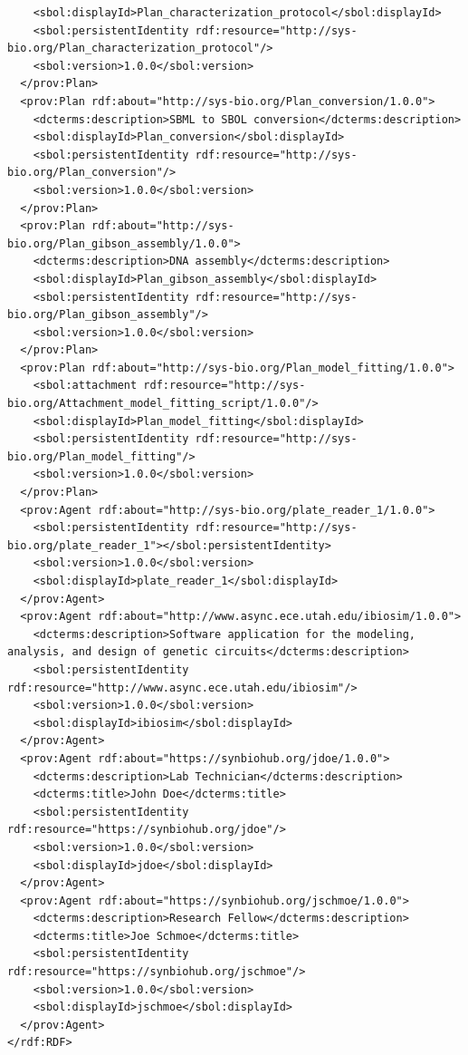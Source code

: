 \begin{lstlisting}
    <sbol:displayId>Plan_characterization_protocol</sbol:displayId>
    <sbol:persistentIdentity rdf:resource="http://sys-bio.org/Plan_characterization_protocol"/>
    <sbol:version>1.0.0</sbol:version>
  </prov:Plan>
  <prov:Plan rdf:about="http://sys-bio.org/Plan_conversion/1.0.0">
    <dcterms:description>SBML to SBOL conversion</dcterms:description>
    <sbol:displayId>Plan_conversion</sbol:displayId>
    <sbol:persistentIdentity rdf:resource="http://sys-bio.org/Plan_conversion"/>
    <sbol:version>1.0.0</sbol:version>
  </prov:Plan>
  <prov:Plan rdf:about="http://sys-bio.org/Plan_gibson_assembly/1.0.0">
    <dcterms:description>DNA assembly</dcterms:description>
    <sbol:displayId>Plan_gibson_assembly</sbol:displayId>
    <sbol:persistentIdentity rdf:resource="http://sys-bio.org/Plan_gibson_assembly"/>
    <sbol:version>1.0.0</sbol:version>
  </prov:Plan>
  <prov:Plan rdf:about="http://sys-bio.org/Plan_model_fitting/1.0.0">
    <sbol:attachment rdf:resource="http://sys-bio.org/Attachment_model_fitting_script/1.0.0"/>
    <sbol:displayId>Plan_model_fitting</sbol:displayId>
    <sbol:persistentIdentity rdf:resource="http://sys-bio.org/Plan_model_fitting"/>
    <sbol:version>1.0.0</sbol:version>
  </prov:Plan>
  <prov:Agent rdf:about="http://sys-bio.org/plate_reader_1/1.0.0">
    <sbol:persistentIdentity rdf:resource="http://sys-bio.org/plate_reader_1"></sbol:persistentIdentity>
    <sbol:version>1.0.0</sbol:version>
    <sbol:displayId>plate_reader_1</sbol:displayId>
  </prov:Agent>
  <prov:Agent rdf:about="http://www.async.ece.utah.edu/ibiosim/1.0.0">
    <dcterms:description>Software application for the modeling, analysis, and design of genetic circuits</dcterms:description>
    <sbol:persistentIdentity rdf:resource="http://www.async.ece.utah.edu/ibiosim"/>
    <sbol:version>1.0.0</sbol:version>
    <sbol:displayId>ibiosim</sbol:displayId>
  </prov:Agent>
  <prov:Agent rdf:about="https://synbiohub.org/jdoe/1.0.0">
    <dcterms:description>Lab Technician</dcterms:description>
    <dcterms:title>John Doe</dcterms:title>
    <sbol:persistentIdentity rdf:resource="https://synbiohub.org/jdoe"/>
    <sbol:version>1.0.0</sbol:version>
    <sbol:displayId>jdoe</sbol:displayId>
  </prov:Agent>
  <prov:Agent rdf:about="https://synbiohub.org/jschmoe/1.0.0">
    <dcterms:description>Research Fellow</dcterms:description>
    <dcterms:title>Joe Schmoe</dcterms:title>
    <sbol:persistentIdentity rdf:resource="https://synbiohub.org/jschmoe"/>
    <sbol:version>1.0.0</sbol:version>
    <sbol:displayId>jschmoe</sbol:displayId>
  </prov:Agent>
</rdf:RDF>
\end{lstlisting}


